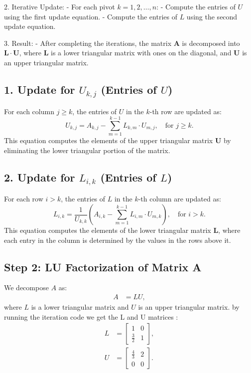\documentclass[journal]{IEEEtran}
\begin{document}
	2. Iterative Update:
	- For each pivot $ k = 1, 2, \ldots, n $:
	- Compute the entries of $ U $ using the first update equation.
	- Compute the entries of $ L $ using the second update equation.
	
	3. Result:
	- After completing the iterations, the matrix $ \mathbf{A} $ is decomposed into $ \mathbf{L} \cdot \mathbf{U} $, where $ \mathbf{L} $ is a lower triangular matrix with ones on the diagonal, and $ \mathbf{U} $ is an upper triangular matrix.
	
	
	
	\subsection*{1. Update for $ U_{k,j} $ (Entries of $ U $)}
	
	For each column $ j \geq k $, the entries of $ U $ in the $ k $-th row are updated as:
	\[
	U_{k,j} = A_{k,j} - \sum_{m=1}^{k-1} L_{k,m} \cdot U_{m,j}, \quad \text{for } j \geq k.
	\]
	This equation computes the elements of the upper triangular matrix $ \mathbf{U} $ by eliminating the lower triangular portion of the matrix.
	
	\subsection*{2. Update for $ L_{i,k} $ (Entries of $ L $)}
	
	For each row $ i > k $, the entries of $ L $ in the $ k $-th column are updated as:
	\[
	L_{i,k} = \frac{1}{U_{k,k}} \left( A_{i,k} - \sum_{m=1}^{k-1} L_{i,m} \cdot U_{m,k} \right), \quad \text{for } i > k.
	\]
	This equation computes the elements of the lower triangular matrix $ \mathbf{L} $, where each entry in the column is determined by the values in the rows above it.\\
	\subsection*{Step 2: LU Factorization of Matrix A}
	We decompose $A$ as:
	\begin{align}
		A &= LU,
	\end{align}
	where $L$ is a lower triangular matrix and $U$ is an upper triangular matrix.
	by running the iteration code we get the L and U matrices :
	\begin{align}
		L &= \begin{bmatrix} 1 & 0 \\ \frac{3}{2} & 1 \end{bmatrix}, \\
		U &= \begin{bmatrix} \frac{4}{3} & 2 \\ 0 & 0 \end{bmatrix}.
	\end{align}
	
\end{document}

